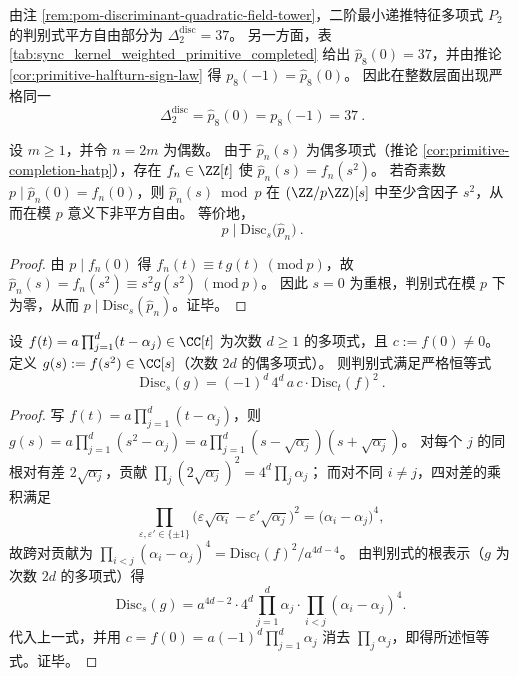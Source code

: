 \begin{remark}[二次分辨率与半转端点的对角锁定：\texorpdfstring{$\Delta_2^{\mathrm{disc}}=\widehat p_8(0)=37$}{Delta2disc=hatp8(0)=37}]\label{rem:delta2disc-hatp8-diagonal-lock}
由注 \ref{rem:pom-discriminant-quadratic-field-tower}，二阶最小递推特征多项式 \(P_2\) 的判别式平方自由部分为 \(\Delta_2^{\mathrm{disc}}=37\)。
另一方面，表 \ref{tab:sync_kernel_weighted_primitive_completed} 给出 \(\widehat p_8(0)=37\)，并由推论 \ref{cor:primitive-halfturn-sign-law} 得 \(p_8(-1)=\widehat p_8(0)\)。
因此在整数层面出现严格同一
\[
\boxed{\ \Delta_2^{\mathrm{disc}}=\widehat p_8(0)=p_8(-1)=37\ }.
\]
\end{remark}

\begin{proposition}\label{prop:halfturn-prime-divides-discriminant}
设 \(m\ge 1\)，并令 \(n=2m\) 为偶数。
由于 \(\widehat p_n(s)\) 为偶多项式（推论 \ref{cor:primitive-completion-hatp}），存在 \(f_n\in\ZZ[t]\) 使
\(\widehat p_n(s)=f_n(s^2)\)。
若奇素数 \(p\mid \widehat p_n(0)=f_n(0)\)，则
\(\widehat p_n(s)\bmod p\) 在 \((\ZZ/p\ZZ)[s]\) 中至少含因子 \(s^2\)，从而在模 \(p\) 意义下非平方自由。
等价地，
\[
\boxed{\ p\mid \mathrm{Disc}_s\!\bigl(\widehat p_n\bigr)\ }.
\]
\end{proposition}
\begin{proof}
由 \(p\mid f_n(0)\) 得 \(f_n(t)\equiv t\,g(t)\ (\mathrm{mod}\ p)\)，故
\(\widehat p_n(s)=f_n(s^2)\equiv s^2 g(s^2)\ (\mathrm{mod}\ p)\)。
因此 \(s=0\) 为重根，判别式在模 \(p\) 下为零，从而 \(p\mid \mathrm{Disc}_s(\widehat p_n)\)。证毕。
\end{proof}

\begin{lemma}\label{lem:disc-square-substitution-split}
设 \(f(t)=a\prod_{j=1}^{d}(t-\alpha_j)\in\CC[t]\) 为次数 \(d\ge 1\) 的多项式，且 \(c:=f(0)\neq 0\)。
定义 \(g(s):=f(s^2)\in\CC[s]\)（次数 \(2d\) 的偶多项式）。
则判别式满足严格恒等式
\[
\boxed{\ \mathrm{Disc}_s(g)=(-1)^d\,4^d\,a\,c\cdot \mathrm{Disc}_t(f)^2\ }.
\]
\end{lemma}
\begin{proof}
写 \(f(t)=a\prod_{j=1}^{d}(t-\alpha_j)\)，则
\(
g(s)=a\prod_{j=1}^{d}(s^2-\alpha_j)
=a\prod_{j=1}^{d}(s-\sqrt{\alpha_j})(s+\sqrt{\alpha_j})
\)。
对每个 \(j\) 的同根对有差 \(2\sqrt{\alpha_j}\)，贡献
\(\prod_{j}(2\sqrt{\alpha_j})^2=4^d\prod_j \alpha_j\)；
而对不同 \(i\neq j\)，四对差的乘积满足
\[
\prod_{\varepsilon,\varepsilon'\in\{\pm 1\}}\bigl(\varepsilon\sqrt{\alpha_i}-\varepsilon'\sqrt{\alpha_j}\bigr)^2
=\bigl(\alpha_i-\alpha_j\bigr)^4,
\]
故跨对贡献为 \(\prod_{i<j}(\alpha_i-\alpha_j)^4=\mathrm{Disc}_t(f)^2/a^{4d-4}\)。
由判别式的根表示（\(g\) 为次数 \(2d\) 的多项式）得
\[
\mathrm{Disc}_s(g)=a^{4d-2}\cdot 4^d\prod_{j=1}^{d}\alpha_j\cdot\prod_{i<j}(\alpha_i-\alpha_j)^4.
\]
代入上一式，并用
\(
c=f(0)=a(-1)^d\prod_{j=1}^{d}\alpha_j
\)
消去 \(\prod_j\alpha_j\)，即得所述恒等式。证毕。
\end{proof}

